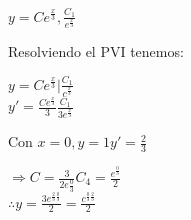 \begin{center}
    $y=C e^{\frac{x}{3}}, \frac{C_{1}}{e^{\frac{x}{3}}}$
\end{center}

Resolviendo el PVI tenemos:\\

\begin{center}
    $y=C e^{\frac{x}{3}} | \frac{C_{1}}{c^{\frac{x}{3}}} $\\
    
    $y'= \frac{C e^{\frac{x}{3}}}{3} \frac{C_{1}}{3 e^{\frac{x}{3}}}$
\end{center}

Con $x=0, y=1 y'=\frac{2}{3}$\\

\begin{center}
    $\Rightarrow C= \frac{3}{2e\frac{0}{3}} C_{4}= \frac{e^{\frac{0}{3}}}{2}$\\
    
    $\therefore y= \frac{3e^{\frac{2}{3}\frac{0}{3}}}{2} = \frac{c^{\frac{0}{3}\frac{2}{3}}}{2}  $
\end{center}


